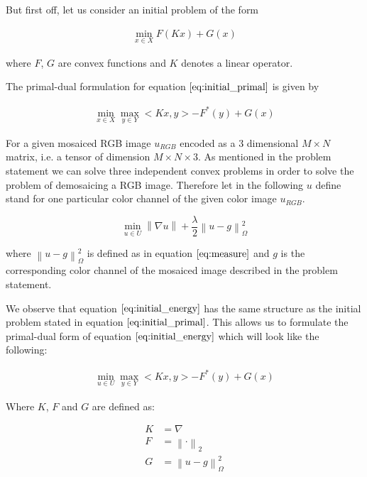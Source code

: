 \documentclass{paper}
\newcommand{\norm}[1]{\left\lVert#1\right\rVert}
\begin{document}
But first off, let us consider an initial problem of the form 

\begin{align}
	\min_{x \in X} F(K x) + G(x)
\label{eq:initial_primal}	
\end{align}

where $F$, $G$ are convex functions and $K$ denotes a linear operator. 

The primal-dual formulation for equation $\ref{eq:initial_primal}$ is given by 

\begin{align}
	\min_{x \in X} \max_{y \in Y} < Kx, y > - F^*(y) + G(x)
\label{eq:initial_primal_dual}	
\end{align}


For a given mosaiced RGB image $u_{RGB}$ encoded as a 3 dimensional $M \times N$ matrix, i.e. a tensor of dimension $M \times N \times 3$. As mentioned in the problem statement we can solve three independent convex problems in order to solve the problem of demosaicing a RGB image. Therefore let in the following $u$ define stand for one particular color channel of the given color image $u_{RGB}$.

\begin{equation}
\min_{u \in U} \norm{\nabla u} + \frac{\lambda}{2} \norm{u - g}^2_{\Omega}
\label{eq:initial_energy}
\end{equation}

where $\norm{u - g}^2_{\Omega}$ is defined as in equation $\ref{eq:measure}$ and $g$ is the corresponding color channel of the mosaiced image described in the problem statement.

We observe that equation $\ref{eq:initial_energy}$ has the same structure as the initial problem stated in equation $\ref{eq:initial_primal}$. This allows us to formulate the primal-dual form of equation $\ref{eq:initial_energy}$ which will look like the following:

\begin{align}
	\min_{u \in U} \max_{y \in Y} < Kx, y > - F^*(y) + G(x)
\label{eq:initial_primal_dual}	
\end{align}

Where $K$, $F$ and $G$ are defined as:

\begin{align}
	K &= \nabla \nonumber \\
	F &= \norm{\cdot}_2 \nonumber \\
	G &= \norm{u - g}^2_{\Omega}
\label{eq:def_kfg}	
\end{align}
\end{document}
